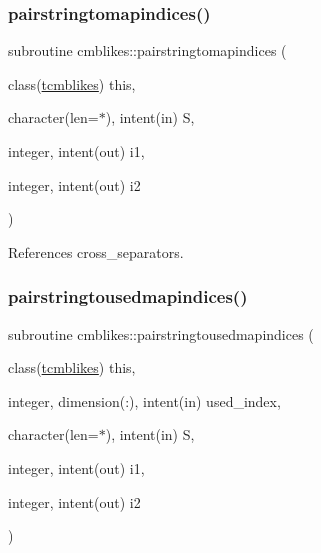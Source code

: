 \mbox{\label{namespacecmblikes_a41e3ac813ae7de0d8a76ffdd669077f1}} 
\subsubsection{\texorpdfstring{pairstringtomapindices()}{pairstringtomapindices()}}
{\footnotesize\ttfamily subroutine cmblikes\+::pairstringtomapindices (\begin{DoxyParamCaption}\item[{class(\mbox{\hyperlink{structcmblikes_1_1tcmblikes}{tcmblikes}})}]{this,  }\item[{character(len=$\ast$), intent(in)}]{S,  }\item[{integer, intent(out)}]{i1,  }\item[{integer, intent(out)}]{i2 }\end{DoxyParamCaption})\hspace{0.3cm}{\ttfamily [private]}}



References cross\+\_\+separators.

\mbox{\label{namespacecmblikes_af5bfde8e9716fa2038de9aec00e88699}} 
\subsubsection{\texorpdfstring{pairstringtousedmapindices()}{pairstringtousedmapindices()}}
{\footnotesize\ttfamily subroutine cmblikes\+::pairstringtousedmapindices (\begin{DoxyParamCaption}\item[{class(\mbox{\hyperlink{structcmblikes_1_1tcmblikes}{tcmblikes}})}]{this,  }\item[{integer, dimension(\+:), intent(in)}]{used\+\_\+index,  }\item[{character(len=$\ast$), intent(in)}]{S,  }\item[{integer, intent(out)}]{i1,  }\item[{integer, intent(out)}]{i2 }\end{DoxyParamCaption})\hspace{0.3cm}{\ttfamily [private]}}

